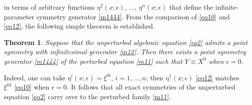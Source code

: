 \documentclass[11pt,letter,subeqn]{article}
\newtheorem{theorem}{Theorem}[section]
\begin{document}
in terms of arbitrary functions $\eta^2(x;\epsilon)$, $\ldots$, $\eta^n(x;\epsilon)$ that define the infinite-parameter symmetry generator \eqref{m1444}. From the comparison of \eqref{eq10} and \eqref{eq12}, the following simple theorem is established.
\begin{theorem}
Suppose that the unperturbed algebraic equation \eqref{eq2} admits a point symmetry with infinitesimal generator \eqref{m12}. Then there exists a point symmetry generator \eqref{m1444} of the perturbed equation \eqref{m11} such that $Y\equiv X^0$ when $\epsilon=0$.
\end{theorem}
Indeed, one can take $\eta^{i}(x;\epsilon)= \xi^{0i}$, $i=1,...,n$; then $\eta^1(x;\epsilon)$ \eqref{eq12} matches $ \xi^{01}$ \eqref{eq10} when $\epsilon=0$. It follows that all exact symmetries of the unperturbed equation \eqref{eq2} carry over to the perturbed family \eqref{m11}.
\end{document}
